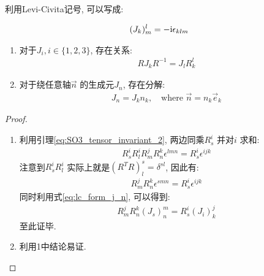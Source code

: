 利用Levi-Civita记号, 可以写成:

\begin{equation}\label{eq:lc_form_j_n}
  \begin{aligned}
    (J_{k})^{l}_{m} = - {\rm i} \epsilon_{klm}
  \end{aligned}
\end{equation}

\begin{theorem}
  \begin{enumerate}
    \item 对于$J_{i}, i\in \{1,2,3\}$, 存在关系:
      \begin{equation}
        \begin{aligned}
          R J_{k} R^{-1} = J_{l} R^{l}_{k}
        \end{aligned}
      \end{equation}

    \item 对于绕任意轴$\vec{n}$ 的生成元$J_{n}$, 存在分解:
      \begin{equation}
        \begin{aligned}
          J_{n} = J_{k} n_{k},\quad \text{where } \vec{n} = n_{k}\vec{e}_{k}
        \end{aligned}
      \end{equation}
  \end{enumerate}
\end{theorem}
\begin{proof}
  \begin{enumerate}
    \item 利用引理\ref{eq:SO3_tensor_invariant_2}, 两边同乘$R^{i}_{s}$ 并对$i$ 求和:
      \begin{equation}
        \begin{aligned}
          R^{i}_{s}R^{i}_{l}R^{j}_{m}R^{k}_{n}\epsilon^{lmn} = R^{i}_{s}\epsilon^{ijk}
        \end{aligned}
      \end{equation}
      注意到$R^{i}_{s}R^{i}_{l}$ 实际上就是$(R^{T}R)^{s}_{l}=\delta^{sl}$,
      因此有:
      \begin{equation}
        \begin{aligned}
          R^{j}_{m}R^{k}_{n}\epsilon^{smn} = R^{i}_{s}\epsilon^{ijk}
        \end{aligned}
      \end{equation}
      同时利用式\ref{eq:lc_form_j_n}, 可以得到:
      \begin{equation}
        \begin{aligned}
          R^{j}_{m}R^{k}_{n}(J_{s})^{m}_{n} = R^{i}_{s}(J_{i})^{j}_{k}
        \end{aligned}
      \end{equation}
      至此证毕.
    \item 利用1中结论易证.
  \end{enumerate}
\end{proof}

